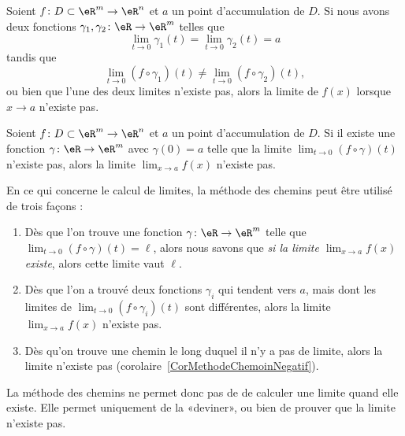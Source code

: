 \begin{corollary}	\label{CorMethodeChemin}
	Soient \( f\colon D\subset\eR^m\to \eR^n\) et \( a\) un point d'accumulation de \( D\). Si nous avons deux fonctions \( \gamma_1,\gamma_2\colon \eR\to \eR^m\) telles que
	\begin{equation}
		\lim_{t\to 0} \gamma_1(t)=\lim_{t\to 0} \gamma_2(t)=a
	\end{equation}
	tandis que
	\begin{equation}
		\lim_{t\to 0} (f\circ \gamma_1)(t)\neq\lim_{t\to 0} (f\circ \gamma_2)(t),
	\end{equation}
	ou bien que l'une des deux limites n'existe pas, alors la limite de \( f(x)\) lorsque \( x\to a\) n'existe pas.
\end{corollary}

\begin{corollary}	\label{CorMethodeChemoinNegatif}
	Soient \( f\colon D\subset\eR^m\to \eR^n\) et \( a\) un point d'accumulation de \( D\). Si il existe une fonction \( \gamma\colon \eR\to \eR^m\) avec \( \gamma(0)=a\) telle que la limite \( \lim_{t\to 0} (f\circ\gamma)(t)\) n'existe pas, alors la limite \( \lim_{x\to a} f(x)\) n'existe pas.
\end{corollary}

En ce qui concerne le calcul de limites, la méthode des chemins peut être utilisé de trois façons :
\begin{enumerate}
	\item
	      Dès que l'on trouve une fonction \( \gamma\colon \eR\to \eR^m\) telle que \( \lim_{t\to 0} (f\circ \gamma)(t)=\ell\), alors nous savons que \emph{si la limite \( \lim_{x\to a} f(x)\) existe}, alors cette limite vaut \( \ell\).
	\item
	      Dès que l'on a trouvé deux fonctions \( \gamma_i\) qui tendent vers \( a\), mais dont les limites de \( \lim_{t\to 0} (f\circ\gamma_i)(t)\) sont différentes, alors la limite \( \lim_{x\to a} f(x)\) n'existe pas.
	\item
	      Dès qu'on trouve une chemin le long duquel il n'y a pas de limite, alors la limite n'existe pas (corolaire~\ref{CorMethodeChemoinNegatif}).
\end{enumerate}
La méthode des chemins ne permet donc pas de de calculer une limite quand elle existe. Elle permet uniquement de la «deviner», ou bien de prouver que la limite n'existe pas.

